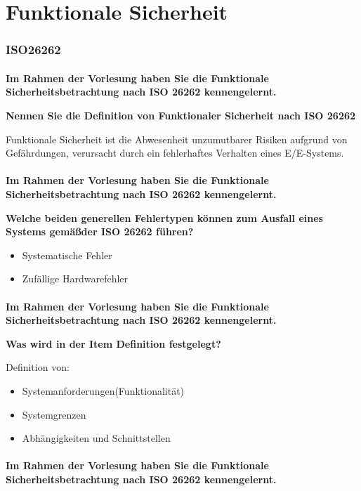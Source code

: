 \part{Funktionale Sicherheit}
\section{ISO26262}
\subsection{}
\textbf{Im Rahmen der Vorlesung haben Sie die Funktionale Sicherheitsbetrachtung nach ISO 26262 kennengelernt.}

\textbf{Nennen Sie die Definition von Funktionaler Sicherheit nach ISO 26262}

Funktionale Sicherheit ist die Abwesenheit unzumutbarer Risiken aufgrund von Gefährdungen, verursacht durch ein fehlerhaftes Verhalten eines E/E-Systems.

\subsection{}
\textbf{Im Rahmen der Vorlesung haben Sie die Funktionale Sicherheitsbetrachtung nach ISO 26262 kennengelernt.}

\textbf{Welche beiden generellen Fehlertypen können zum Ausfall eines Systems gemä\ss der ISO 26262 führen?}
\begin{itemize}
    \item Systematische Fehler
    \item Zufällige Hardwarefehler
\end{itemize}

\subsection{}
\textbf{Im Rahmen der Vorlesung haben Sie die Funktionale Sicherheitsbetrachtung nach ISO 26262 kennengelernt.}

\textbf{Was wird in der Item Definition festgelegt?}

Definition von:
\begin{itemize}
    \item Systemanforderungen(Funktionalität)
    \item Systemgrenzen
    \item Abhängigkeiten und Schnittstellen
\end{itemize}

\subsection{}
\textbf{Im Rahmen der Vorlesung haben Sie die Funktionale Sicherheitsbetrachtung nach ISO 26262 kennengelernt.}

